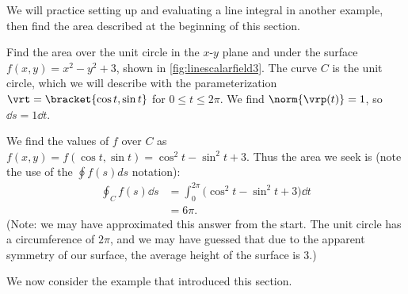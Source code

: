 We will practice setting up and evaluating a line integral in another example, then find the area described at the beginning of this section.

\begin{example}\label{ex_linescalarfield3}%
Find
%
%
the area over the unit circle in the $x$-$y$ plane and under the surface $f(x,y) = x^2-y^2+3$, shown in \autoref{fig:linescalarfield3}.
\solution
The curve $C$ is the unit circle, which we will describe with the parameterization $\vrt =\bracket{\cos t,\sin t}$ for $0\leq t\leq 2\pi$. We find $\norm{\vrp(t)} = 1$, so $\dd s = 1 \dd t$.  

We find the values of $f$ over $C$ as $f(x,y) = f(\cos t, \sin t) = \cos^2t-\sin^2t+3$. Thus the area we seek is (note the use of the $\oint f(s) ds$ notation):
\begin{align*}
	\oint_C f(s)\dd s
	&= \int_0^{2\pi}\bigl(\cos^2t-\sin^2t+3\bigr)\dd t \\
	&= 6\pi.
\end{align*}
(Note: we may have approximated this answer from the start. The unit circle has a circumference of $2\pi$, and we may have guessed that due to the apparent symmetry of our surface, the average height of the surface is 3.)
\end{example}

We now consider the example that introduced this section.

